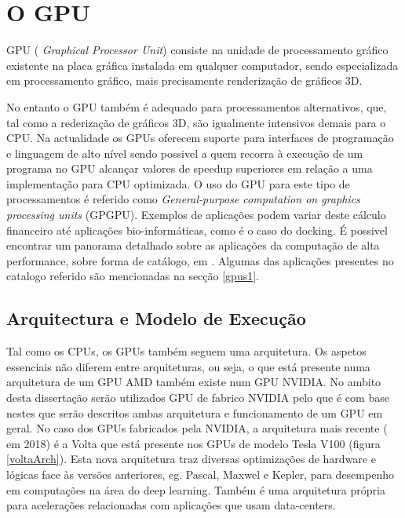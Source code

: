 \section{O GPU}
\label{gpus}
GPU ( \textit{Graphical Processor Unit}) consiste na unidade de processamento gráfico existente na placa gráfica instalada em qualquer computador, sendo especializada em processamento gráfico, mais precisamente renderização de gráficos 3D.

 No entanto o GPU também é adequado para processamentos alternativos, que, tal como a rederização de gráficos 3D, são igualmente intensivos demais para o CPU. Na actualidade os GPUs oferecem suporte para interfaces de programação e linguagem de alto nível sendo possivel a quem recorra à execução de um programa no GPU alcançar valores de speedup superiores em relação a uma implementação para CPU optimizada. O uso do GPU para este tipo de processamentos é referido como \textit{General-purpose computation on graphics processing units} (GPGPU)\cite{gpgpu}. Exemplos de aplicações podem variar deste cálculo financeiro até aplicações bio-informáticas, como é o caso do docking. É possivel encontrar um panorama detalhado sobre as aplicações da computação de alta performance, sobre forma de catálogo, em \cite{cudaIntro}. Algumas das aplicações presentes no catalogo referido são mencionadas na secção \ref{gpus1}. 
 
 
\subsection{Arquitectura e Modelo de Execução}
\label{gpuArch}
Tal como os CPUs, os GPUs também seguem uma arquitetura. Os aspetos essenciais não diferem entre arquiteturas, ou seja, o que está presente numa arquitetura de um GPU AMD também existe num GPU NVIDIA. No ambito desta dissertação serão utilizados GPU de fabrico NVIDIA pelo que é com base nestes que serão descritos ambas arquitetura e funcionamento de um GPU em geral.  No caso dos GPUs fabricados pela NVIDIA, a arquitetura mais recente ( em 2018) é a Volta\cite{voltaArch} que está presente nos GPUs de modelo Tesla V100 (figura \ref{voltaArch}). Esta nova arquitetura traz diversas optimizações de hardware e lógicas face às versões anteriores, eg. Pascal, Maxwel e Kepler, para desempenho em computações na área do deep learning. Também é uma arquitetura própria para acelerações relacionadas com aplicações que usam data-centers.



